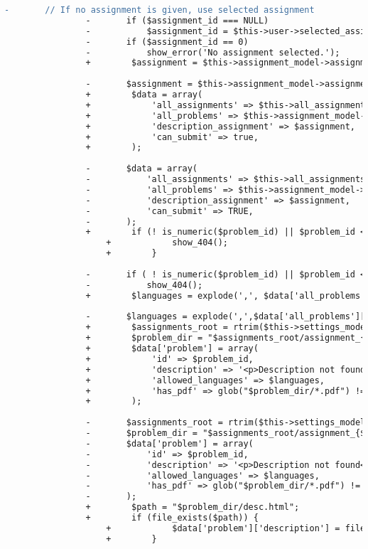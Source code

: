 \begin{lstlisting}[language=diff, caption=Perubahan pada kode Problems.php]
				-		// If no assignment is given, use selected assignment
				-		if ($assignment_id === NULL)
				-			$assignment_id = $this->user->selected_assignment['id'];
				-		if ($assignment_id == 0)
				-			show_error('No assignment selected.');
				+        $assignment = $this->assignment_model->assignment_info($assignment_id);
				
				-		$assignment = $this->assignment_model->assignment_info($assignment_id);
				+        $data = array(
				+            'all_assignments' => $this->all_assignments,
				+            'all_problems' => $this->assignment_model->all_problems($assignment_id),
				+            'description_assignment' => $assignment,
				+            'can_submit' => true,
				+        );
				
				-		$data = array(
				-			'all_assignments' => $this->all_assignments,
				-			'all_problems' => $this->assignment_model->all_problems($assignment_id),
				-			'description_assignment' => $assignment,
				-			'can_submit' => TRUE,
				-		);
				+        if (! is_numeric($problem_id) || $problem_id < 1 || $problem_id > $data['description_assignment']['problems']) {
					+            show_404();
					+        }
				
				-		if ( ! is_numeric($problem_id) || $problem_id < 1 || $problem_id > $data['description_assignment']['problems'])
				-			show_404();
				+        $languages = explode(',', $data['all_problems'][$problem_id]['allowed_languages']);
				
				-		$languages = explode(',',$data['all_problems'][$problem_id]['allowed_languages']);
				+        $assignments_root = rtrim($this->settings_model->get_setting('assignments_root'), '/');
				+        $problem_dir = "$assignments_root/assignment_{$assignment_id}/p{$problem_id}";
				+        $data['problem'] = array(
				+            'id' => $problem_id,
				+            'description' => '<p>Description not found</p>',
				+            'allowed_languages' => $languages,
				+            'has_pdf' => glob("$problem_dir/*.pdf") != false
				+        );
				
				-		$assignments_root = rtrim($this->settings_model->get_setting('assignments_root'),'/');
				-		$problem_dir = "$assignments_root/assignment_{$assignment_id}/p{$problem_id}";
				-		$data['problem'] = array(
				-			'id' => $problem_id,
				-			'description' => '<p>Description not found</p>',
				-			'allowed_languages' => $languages,
				-			'has_pdf' => glob("$problem_dir/*.pdf") != FALSE
				-		);
				+        $path = "$problem_dir/desc.html";
				+        if (file_exists($path)) {
					+            $data['problem']['description'] = file_get_contents($path);
					+        }
				

\end{lstlisting}
